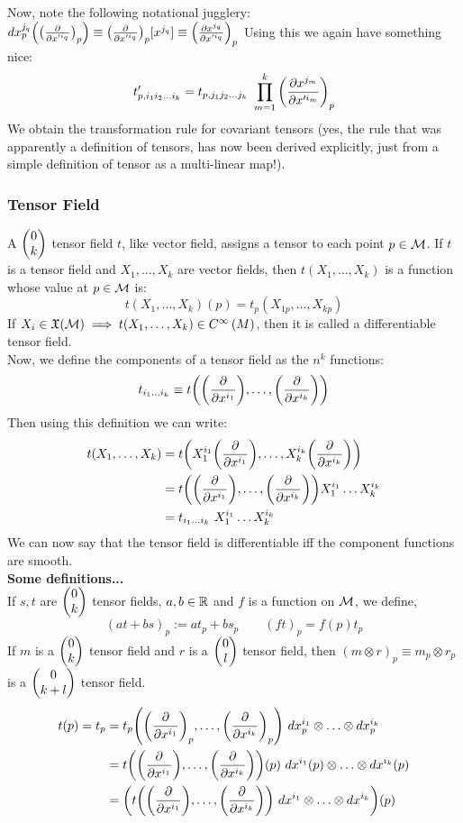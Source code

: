 Now, note the following notational jugglery: $dx_p^{j_q}\qty(\qty(\pdv{x'^{i_q}})_p)\equiv \qty(\pdv{x'^{i_q}})_p[x^{j_q}] \equiv \qty(\pdv{x^{j_q}}{x'^{i_q }})_p$
Using this we again have something nice:
$$t'_{p,i_1i_2\ldots i_k} =t_{p,j_1j_2\ldots j_k} \ \prod\limits_{m=1}^k \qty(\pdv{x^{j_m}}{x'^{i_m }})_p$$
We obtain the transformation rule for covariant tensors (yes, the rule that was apparently a definition of tensors, has now been derived explicitly, just from a simple definition of tensor as a multi-linear map!). 
\subsubsection{Tensor Field}
A $\mqty(0\\k)$ tensor field $t$, like vector field, assigns a tensor to each point $p\in \mathcal M$. If $t$ is a tensor field and $X_1, \ldots, X_k$ are vector fields, then $t(X_1, \ldots, X_k)$ is a function whose value at $p\in \mathcal M$ is:
$$t(X_1,\ldots,X_k)(p) = t_p(X_{1p}, \ldots, X_{kp})$$
If $X_i \in \mathfrak{X}(\mathcal M) \implies t(X_1, \ldots, X_k)\in C^{\infty}\left(M\right)$, then it is called a differentiable tensor field.\\[0.2cm]
Now, we define the components of a tensor field as the $n^k$ functions:
$$t_{i_1 \ldots i_k}\equiv t\qty(\qty(\pdv{x^{i_1}}),\ldots,\qty(\pdv{x^{i_k}}))$$
Then using this definition we can write:
\begin{align*}
    t(X_1,\ldots,X_k) &= t\qty(X_1^{i_1}\qty(\pdv{x^{i_1}}),\ldots, X_k^{i_k}\qty(\pdv{x^{i_k}}))\\
    &=t\qty(\qty(\pdv{x^{i_1}}),\ldots,\qty(\pdv{x^{i_k}})) X_1^{i_1}\ldots X_k^{i_k}\\
    &=t_{i_1 \ldots i_k} \ X^{i_1}_1\ldots X^{i_k}_k
\end{align*}
We can now say that the tensor field is differentiable iff the component functions are smooth. \\[0.2cm]
\textbf{Some definitions...}\\[0.2cm]
If $s,t$ are $\mqty(0\\k)$ tensor fields, $a,b\in\mathbb{R}$ and $f$ is a function on $\mathcal M$, we define, $$(at+bs)_p := at_p + bs_p \qquad (ft)_p = f(p) t_p$$
If $m$ is a $\mqty(0\\k)$ tensor field and $r$ is a $\mqty(0\\l)$ tensor field, then $(m\otimes r)_p\equiv m_p\otimes r_p$ is a $\mqty(0\\k+l)$ tensor field. \\
\begin{align*}
    t(p) = t_p &= t_p\qty(\qty(\pdv{x^{i_1}})_p, \ldots,\qty(\pdv{x^{i_k}})_p) \ dx_p^{i_1}\otimes \ldots \otimes dx_p^{i_k}\\
    &=t\qty(\qty(\pdv{x^{i_1}}), \ldots,\qty(\pdv{x^{i_k}}))(p) \ dx^{i_1}(p)\otimes \ldots \otimes dx^{i_k}(p)\\
    &=\qty(t\qty(\qty(\pdv{x^{i_1}}), \ldots,\qty(\pdv{x^{i_k}})) \ dx^{i_1}\otimes \ldots \otimes dx^{i_k})(p)
\end{align*}
